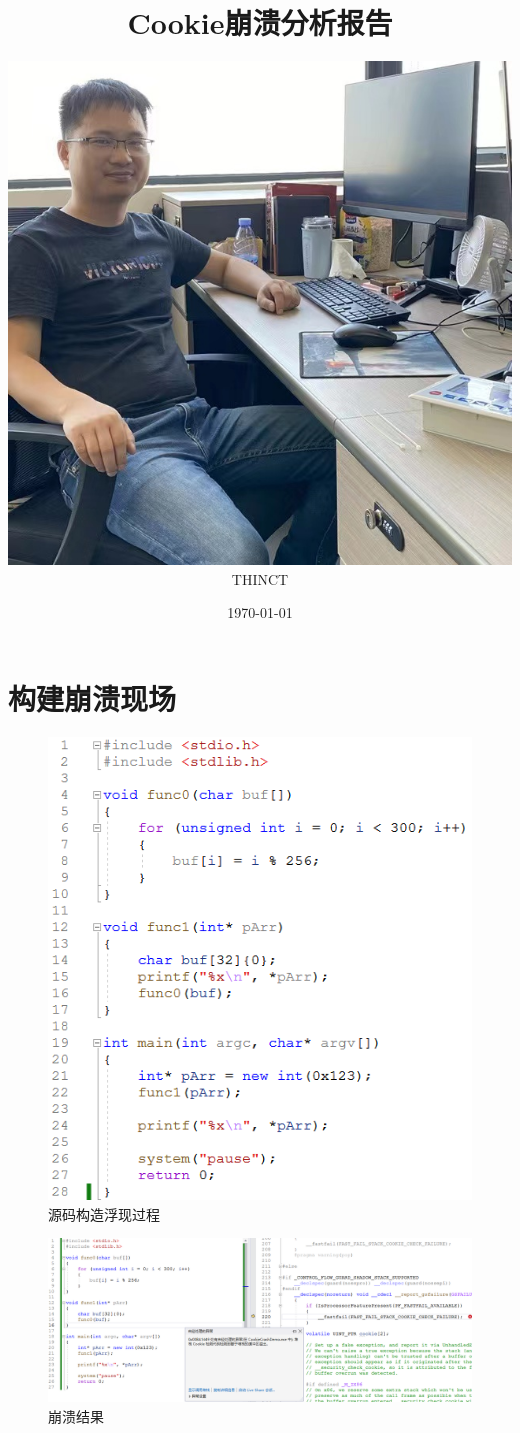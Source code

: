 \documentclass[AutoFakeBold,AutoFakeSlant]{beamer}
\title{Cookie崩溃分析报告}
\date{\today}
\author{\includegraphics[width=0.26\linewidth]{ShowMe}\\THINCT}
\begin{document}
	\maketitle
	
	\section{构建崩溃现场}
	
	\begin{frame}[fragile]
			\begin{figure}
			\centering %
			\includegraphics[width=0.6\linewidth]{1211srccode}
			\caption{源码构造浮现过程}
			\label{fig:sourcecode}
		\end{figure}
	\end{frame}
	
	\begin{frame} 
		\begin{figure}
			\centering %
			\includegraphics[width=1.6\linewidth]{1211crash}
			\caption{崩溃结果}
			\label{fig:crash show}
		\end{figure}
	\end{frame}
	
\end{document}
